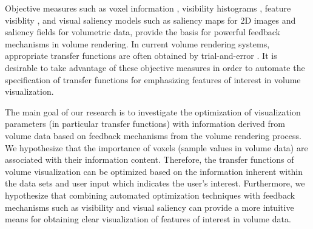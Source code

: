 
Objective measures such as voxel information \cite{bordoloi_view_2005}, visibility histograms \cite{emsenhuber_visibility_2008} \cite{correa_visibility-driven_2009}, feature visiblity \cite{wang_information_2011}, and visual saliency models \cite{emami_selection_2013} such as saliency maps \cite{itti_model_1998} \cite{harel_graph-based_2006} for 2D images and saliency fields \cite{kim_saliency-guided_2006} for volumetric data, provide the basis for powerful feedback mechanisms in volume rendering.
In current volume rendering systems, appropriate transfer functions are often obtained by trial-and-error \cite{pfister_transfer_2001}.
It is desirable to take advantage of these objective measures in order to automate the specification of transfer functions for emphasizing features of interest in volume visualization.

The main goal of our research is to investigate the optimization of visualization parameters (in particular transfer functions) with information derived from volume data based on feedback mechanisms from the volume rendering process.
We hypothesize that the importance of voxels (sample values in volume data) are associated with their information content. Therefore, the transfer functions of volume visualization can be optimized based on the information inherent within the data sets and user input which indicates the user's interest.
Furthermore, we hypothesize that combining automated optimization techniques with feedback mechanisms such as visibility and visual saliency can provide a more intuitive means for obtaining clear visualization of features of interest in volume data.



